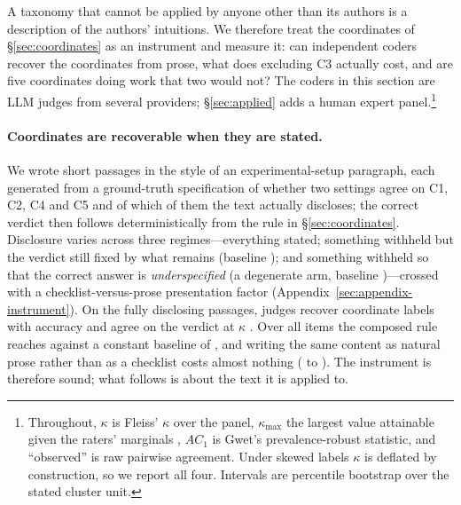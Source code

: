 A taxonomy that cannot be applied by anyone other than its authors is a description of the
authors' intuitions. We therefore treat the coordinates of \S\ref{sec:coordinates} as an
instrument and measure it: can independent coders recover the coordinates from prose, what does
excluding C3 actually cost, and are five coordinates doing work that two would not? The coders
in this section are LLM judges from several providers; \S\ref{sec:applied} adds a human expert
panel.\footnote{Throughout, $\kappa$ is Fleiss' $\kappa$ over the panel, $\kappa_{\max}$ the
largest value attainable given the raters' marginals \citep{umesh1989maxkappa,sim2005kappa},
$AC_1$ is Gwet's prevalence-robust statistic, and ``observed'' is raw pairwise agreement. Under
skewed labels $\kappa$ is deflated by construction, so we report all four. Intervals are
percentile bootstrap over the stated cluster unit.}

\paragraph{Coordinates are recoverable when they are stated.}
We wrote \InsTwoItems{} short passages in the style of an experimental-setup paragraph, each
generated from a ground-truth specification of whether two settings agree on C1, C2, C4 and C5
and of which of them the text actually discloses; the correct verdict then follows
deterministically from the rule in \S\ref{sec:coordinates}. Disclosure varies across three
regimes---everything stated; something withheld but the verdict still fixed by what remains
(baseline \InsBalBase{}); and something withheld so that the correct answer is
\emph{underspecified} (a degenerate arm, baseline \InsForceBase{})---crossed with a
checklist-versus-prose presentation factor (Appendix~\ref{sec:appendix-instrument}). On the
\InsFullN{} fully disclosing passages, \InsTwoJudges{} judges recover coordinate labels with
\InsFullCoord{} accuracy and agree on the verdict at $\kappa$ \InsFullK{}. Over all
\InsTwoScored{} items the composed rule reaches \InsTwoRule{} against a constant baseline of
\InsTwoBase{}, and writing the same content as natural prose rather than as a checklist costs
almost nothing (\InsCanonCoord{} to \InsNatCoord{}). The instrument is therefore sound; what
follows is about the text it is applied to.

